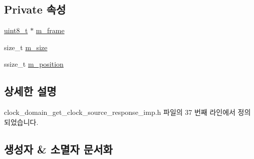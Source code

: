 \subsection*{Private 속성}
\begin{DoxyCompactItemize}
\item 
\hyperlink{stdint_8h_aba7bc1797add20fe3efdf37ced1182c5}{uint8\+\_\+t} $\ast$ \hyperlink{classavdecc__lib_1_1clock__domain__get__clock__source__response__imp_a50417969cf438e7c8d698726bbbe2ff9}{m\+\_\+frame}
\item 
size\+\_\+t \hyperlink{classavdecc__lib_1_1clock__domain__get__clock__source__response__imp_a0dc3c363255f193681c77b4d2a82e995}{m\+\_\+size}
\item 
ssize\+\_\+t \hyperlink{classavdecc__lib_1_1clock__domain__get__clock__source__response__imp_af5e691c4a8a0feb07f48440b321206cd}{m\+\_\+position}
\end{DoxyCompactItemize}


\subsection{상세한 설명}


clock\+\_\+domain\+\_\+get\+\_\+clock\+\_\+source\+\_\+response\+\_\+imp.\+h 파일의 37 번째 라인에서 정의되었습니다.



\subsection{생성자 \& 소멸자 문서화}

